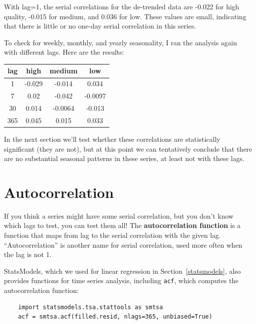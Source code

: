 \documentclass[12pt]{book}
\begin{document}
With lag=1, the serial correlations for the de-trended data are
-0.022 for high quality, -0.015 for medium, and 0.036 for low.
These values are small, indicating that there is little or
no one-day serial correlation in this series.

To check for weekly, monthly, and yearly seasonality, I ran
the analysis again with different lags.  Here are the results:

\begin{center}
\begin{tabular}{|c|c|c|c|}
\hline
lag & high & medium & low \\ \hline
1 & -0.029 & -0.014 & 0.034 \\
7 & 0.02 & -0.042 & -0.0097 \\
30 & 0.014 & -0.0064 & -0.013 \\
365 & 0.045 & 0.015 & 0.033 \\
\hline
\end{tabular}
\end{center}

In the next section we'll test whether these correlations are
statistically significant (they are not), but at this point we can
tentatively conclude that there are no substantial seasonal patterns
in these series, at least not with these lags.
   


\section{Autocorrelation}

If you think a series might have some serial correlation, but you
don't know which lags to test, you can test them all!  The {\bf
  autocorrelation function} is a function that maps from lag to the
serial correlation with the given lag.  ``Autocorrelation'' is another
name for serial correlation, used more often when the lag is not 1.

StatsModels, which we used for linear regression in
Section~\ref{statsmodels}, also provides functions for time series
analysis, including {\tt acf}, which computes the autocorrelation
function:

\begin{verbatim}
    import statsmodels.tsa.stattools as smtsa
    acf = smtsa.acf(filled.resid, nlags=365, unbiased=True)
\end{verbatim}
\end{document}
